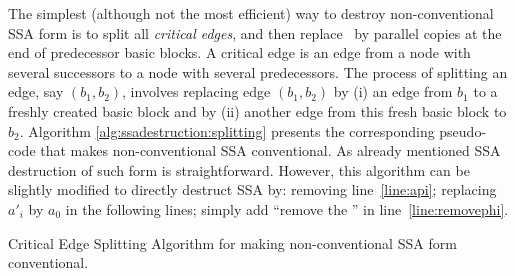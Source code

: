 The simplest (although not the most efficient) way to destroy non-conventional SSA form is to split all \textit{critical edges}, and then replace \phifuns\ by parallel copies at the end of predecessor basic blocks.
A critical edge is an edge from a node with several successors to a node with several predecessors.
The process of splitting an edge, say $(b_1,b_2)$,
involves replacing edge $(b_1, b_2)$ by (i) an
edge from $b_1$ to a freshly created basic block 
and by (ii) another edge from this fresh basic block to $b_2$. 
Algorithm \ref{alg:ssadestruction:splitting} presents
the corresponding pseudo-code that makes non-conventional SSA conventional. 
As already mentioned SSA destruction of such form is straightforward. However, this algorithm can be slightly modified to directly destruct SSA by: removing line~\ref{line:api}; replacing $a'_i$ by $a_0$ in the following lines; simply add ``remove the \phifun'' in line~\ref{line:removephi}.

\begin{algorithm}
\caption{\label{alg:ssadestruction:splitting}Critical Edge Splitting Algorithm for making non-conventional SSA form conventional.}
\end{algorithm}



